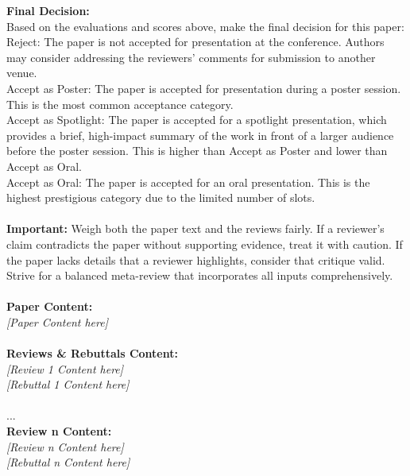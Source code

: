 \begin{figure*}[h]
\begin{prompt}[title={Prompt \thetcbcounter: LLM-as-Meta-Reviewer Function: None COT}]
\textbf{Final Decision:}\\
Based on the evaluations and scores above, make the final decision for this paper: \\
Reject: The paper is not accepted for presentation at the conference. Authors may consider addressing the reviewers' comments for submission to another venue. \\
Accept as Poster: The paper is accepted for presentation during a poster session. This is the most common acceptance category. \\
Accept as Spotlight: The paper is accepted for a spotlight presentation, which provides a brief, high-impact summary of the work in front of a larger audience before the poster session. This is higher than Accept as Poster and lower than Accept as Oral. \\
Accept as Oral: The paper is accepted for an oral presentation. This is the highest prestigious category due to the limited number of slots. \\ \\


\textbf{Important:} Weigh both the paper text and the reviews fairly. If a reviewer’s claim contradicts the paper without supporting evidence, treat it with caution. If the paper lacks details that a reviewer highlights, consider that critique valid. Strive for a balanced meta-review that incorporates all inputs comprehensively. \\ \\

\textbf{Paper Content:} \\
\textit{[Paper Content here]} \\ \\

\textbf{Reviews \& Rebuttals Content:} \\
\textit{[Review 1 Content here]} \\ 
\textit{[Rebuttal 1 Content here]} \\ \\
... \\
\textbf{Review n Content:} \\
\textit{[Review n Content here]} \\ 
\textit{[Rebuttal n Content here]} 

\end{prompt}
\end{figure*}

